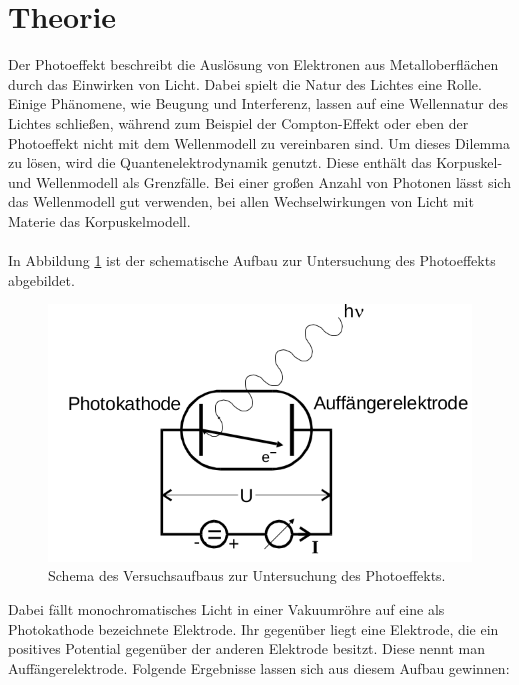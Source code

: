 \maketitle
\setcounter{page}{1}
\tableofcontents
\newpage
{}
\section{Theorie}
Der Photoeffekt beschreibt die Auslösung von Elektronen aus Metalloberflächen
durch das Einwirken von Licht. Dabei spielt die Natur des Lichtes eine Rolle.
Einige Phänomene, wie Beugung und Interferenz, lassen auf eine Wellennatur
des Lichtes schließen, während zum Beispiel der Compton-Effekt oder eben der
Photoeffekt nicht mit dem Wellenmodell zu vereinbaren sind. Um dieses Dilemma zu lösen,
wird die Quantenelektrodynamik genutzt. Diese enthält das Korpuskel- und Wellenmodell
als Grenzfälle. Bei einer großen Anzahl von Photonen lässt sich das Wellenmodell gut verwenden,
bei allen Wechselwirkungen von Licht mit Materie das Korpuskelmodell. \\
\\
In Abbildung \ref{fig:1} ist der schematische Aufbau zur Untersuchung des Photoeffekts abgebildet.
\begin{figure}[h]
  \centering
  \includegraphics[scale=0.4]{aufbautheorie.png}
  \caption{Schema des Versuchsaufbaus zur Untersuchung des Photoeffekts. \cite{anleitung}}
  \label{fig:1}
\end{figure}
Dabei fällt monochromatisches Licht in einer Vakuumröhre auf eine als Photokathode bezeichnete Elektrode.
Ihr gegenüber liegt eine Elektrode, die ein positives Potential gegenüber der anderen Elektrode besitzt.
Diese nennt man Auffängerelektrode. Folgende Ergebnisse lassen sich aus diesem Aufbau gewinnen:
